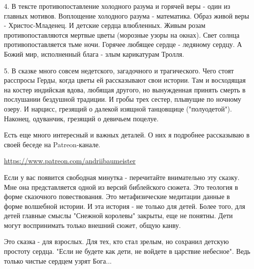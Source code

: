 4. В тексте противопоставление холодного разума и горячей веры - один из
главных мотивов. Воплощение холодного разума - математика. Образ живой веры -
Христос-Младенец. И детские сердца влюбленных. Живым розам противопоставляются
мертвые цветы (морозные узоры на окнах). Свет солнца противопоставляется тьме
ночи. Горячее любящее сердце - ледяному сердцу. А Божий мир, исполненный блага
- злым карикатурам Тролля.  

5. В сказке много совсем недетского, загадочного и трагического. Чего стоят
расспросы Герды, когда цветы ей рассказывают свои истории. Там и восходящая на
костер индийская вдова, любящая другого, но вынужденная принять смерть в
послушании бездушной традиции. И гробы трех сестер, плывущие по ночному озеру.
И нарцисс, грезящий о далекой изящной танцовщице ("полуодетой"). Наконец,
одуванчик, грезящий о девичьем поцелуе. 

Есть еще много интересный и важных деталей. О них я подробнее рассказываю в
своей беседе на Patreon-канале. 

\url{https://www.patreon.com/andriibaumeister} 

Если у вас появится свободная минутка - перечитайте внимательно эту сказку. Мне
она представляется одной из версий библейского сюжета. Это теология в форме
сказочного повествования. Это метафизические медитации данные в форме волшебной
истории. И эта история - не только для детей. Более того, для детей главные
смыслы "Снежной королевы" закрыты, еще не понятны. Дети могут воспринимать
только внешний сюжет, общую канву. 

Это сказка - для взрослых. Для тех, кто стал зрелым, но сохранил детскую
простоту сердца. "Если не будете как дети, не войдете в царствие небесное".
Ведь только чистые сердцем узрят Бога...

